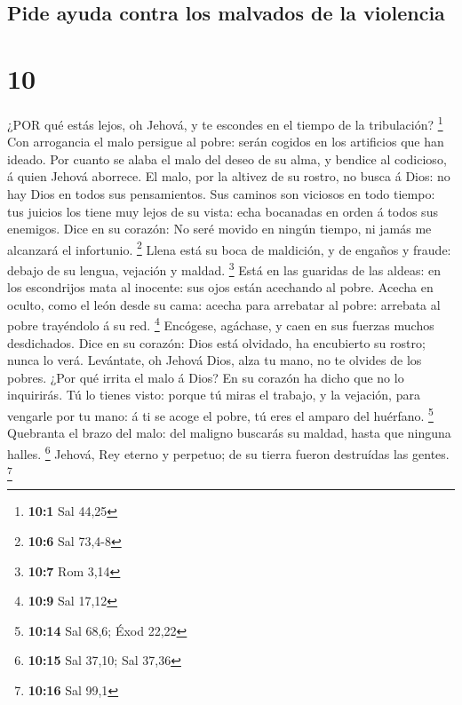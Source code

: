 \hypertarget{pide-ayuda-contra-los-malvados-de-la-violencia}{%
\subsection{Pide ayuda contra los malvados de la
violencia}\label{pide-ayuda-contra-los-malvados-de-la-violencia}}

\hypertarget{section-9}{%
\section{10}\label{section-9}}

 ¿POR qué estás lejos, oh Jehová, y te escondes en el tiempo
de la tribulación? \footnote{\textbf{10:1} Sal 44,25}  Con
arrogancia el malo persigue al pobre: serán cogidos en los artificios
que han ideado.  Por cuanto se alaba el malo del deseo de su
alma, y bendice al codicioso, á quien Jehová aborrece.  El
malo, por la altivez de su rostro, no busca á Dios: no hay Dios en todos
sus pensamientos.  Sus caminos son viciosos en todo tiempo:
tus juicios los tiene muy lejos de su vista: echa bocanadas en orden á
todos sus enemigos.  Dice en su corazón: No seré movido en
ningún tiempo, ni jamás me alcanzará el infortunio. \footnote{\textbf{10:6}
  Sal 73,4-8}  Llena está su boca de maldición, y de engaños
y fraude: debajo de su lengua, vejación y maldad. \footnote{\textbf{10:7}
  Rom 3,14}  Está en las guaridas de las aldeas: en los
escondrijos mata al inocente: sus ojos están acechando al pobre.
 Acecha en oculto, como el león desde su cama: acecha para
arrebatar al pobre: arrebata al pobre trayéndolo á su red. \footnote{\textbf{10:9}
  Sal 17,12}  Encógese, agáchase, y caen en sus fuerzas
muchos desdichados.  Dice en su corazón: Dios está
olvidado, ha encubierto su rostro; nunca lo verá. 
Levántate, oh Jehová Dios, alza tu mano, no te olvides de los pobres.
 ¿Por qué irrita el malo á Dios? En su corazón ha dicho que
no lo inquirirás.  Tú lo tienes visto: porque tú miras el
trabajo, y la vejación, para vengarle por tu mano: á ti se acoge el
pobre, tú eres el amparo del huérfano. \footnote{\textbf{10:14} Sal
  68,6; Éxod 22,22}  Quebranta el brazo del malo: del
maligno buscarás su maldad, hasta que ninguna halles. \footnote{\textbf{10:15}
  Sal 37,10; Sal 37,36}  Jehová, Rey eterno y perpetuo; de
su tierra fueron destruídas las gentes. \footnote{\textbf{10:16} Sal
  99,1}

